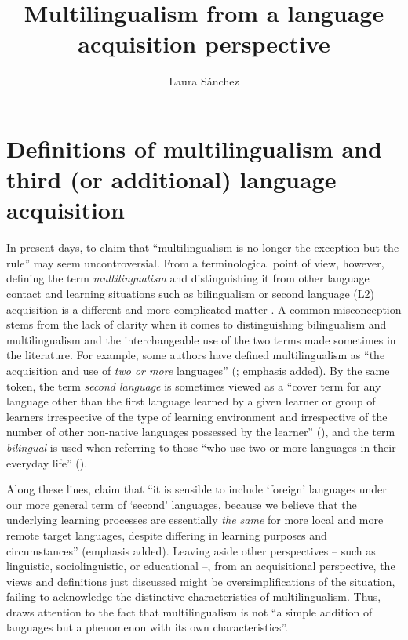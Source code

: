 \documentclass[output=paper]{../langscibook}
\author{Laura Sánchez\affiliation{Stockholm University}}
\title{Multilingualism from a language acquisition perspective}
\begin{document}
\maketitle

\section{Definitions of multilingualism and third (or additional) language acquisition}\label{sec:sanchez1:1}

In present days, to claim that “multilingualism is no longer the exception but the rule” \citep[113]{Sánchez2019CLIL} may seem uncontroversial. From a terminological point of view, however, defining the term \textit{multilingualism} and distinguishing it from other language contact and learning situations such as bilingualism or second language (L2) acquisition is a different and more complicated matter \citep{Cenoz2013}. A common misconception stems from the lack of clarity when it comes to distinguishing bilingualism and multilingualism and the interchangeable use of the two terms made sometimes in the literature. For example, some authors have defined multilingualism as “the acquisition and use of \textit{two or more} languages” (\citealt[2]{AroninSingleton2008}; emphasis added). By the same token, the term \textit{second language} is sometimes viewed as a “cover term for any language other than the first language learned by a given learner or group of learners irrespective of the type of learning environment and irrespective of the number of other non-native languages possessed by the learner” (\citealt[7]{SharwoodSmith1994}), and the term \textit{bilingual} is used when referring to those “who use two or more languages in their everyday life” (\citealt[xiii]{Grosjean2010}).

Along these lines, \citet[2]{MitchellMyles1998} claim that “it is sensible to include ‘foreign’ languages under our more general term of ‘second’ languages, because we believe that the underlying learning processes are essentially \textit{the same} for more local and more remote target languages, despite differing in learning purposes and circumstances” (emphasis added). Leaving aside other perspectives – such as linguistic, sociolinguistic, or educational –, from an acquisitional perspective, the views and definitions just discussed might be oversimplifications of the situation, failing to acknowledge the distinctive characteristics of multilingualism. Thus, \citet[14]{Cenoz2013} draws attention to the fact that multilingualism is not “a simple addition of languages but a phenomenon with its own characteristics”.
\end{document}
